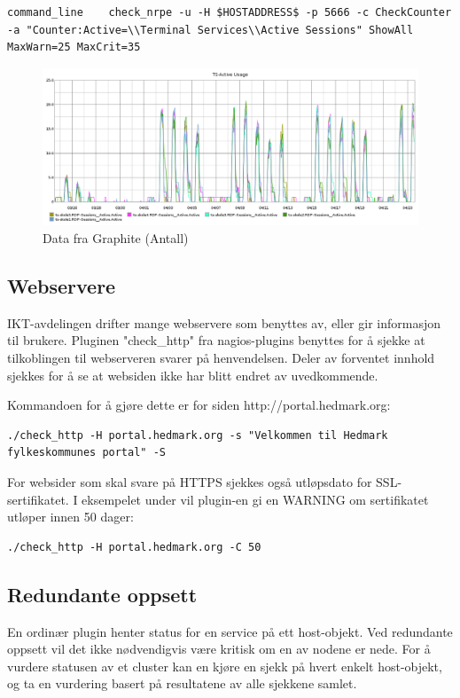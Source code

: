 \begin{lstlisting}[style=example]
	command_line	check_nrpe -u -H $HOSTADDRESS$ -p 5666 -c CheckCounter -a "Counter:Active=\\Terminal Services\\Active Sessions" ShowAll MaxWarn=25 MaxCrit=35
\end{lstlisting}

\begin{figure}[H]
	\centering
	\includegraphics[width=1.0\textwidth]{img/ts-skole-usage-inv}
	\caption{Data fra Graphite (Antall)}
	\label{ts-skole-usage}
\end{figure}

\subsection{Webservere}
IKT-avdelingen drifter mange webservere som benyttes av, eller gir informasjon til brukere. Pluginen "check\_http" \cite{checkhttp} fra nagios-plugins benyttes for å sjekke at tilkoblingen til webserveren svarer på henvendelsen. Deler av forventet innhold sjekkes for å se at websiden ikke har blitt endret av uvedkommende.

Kommandoen for å gjøre dette er for siden http://portal.hedmark.org:
\begin{lstlisting}[style=example]
./check_http -H portal.hedmark.org -s "Velkommen til Hedmark fylkeskommunes portal" -S 
\end{lstlisting}

For websider som skal svare på HTTPS sjekkes også utløpsdato for SSL-sertifikatet. I eksempelet under vil plugin-en gi en WARNING om sertifikatet utløper innen 50 dager:
\begin{lstlisting}[style=example]
./check_http -H portal.hedmark.org -C 50
\end{lstlisting}

\subsection{Redundante oppsett}
En ordinær plugin henter status for en service på ett host-objekt. Ved redundante oppsett vil det ikke nødvendigvis være kritisk om en av nodene er nede. For å vurdere statusen av et cluster kan en kjøre en sjekk på hvert enkelt host-objekt, og ta en vurdering basert på resultatene av alle sjekkene samlet.

